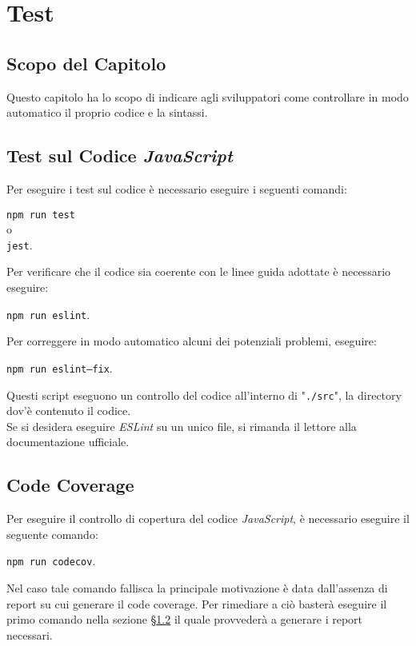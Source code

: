 \section{Test}\label{Test}

\subsection{Scopo del Capitolo}\label{Test_scopo}
Questo capitolo ha lo scopo di indicare agli sviluppatori come controllare in modo automatico il proprio codice e la sintassi.

\subsection{Test sul Codice \textit{JavaScript}}\label{test_JS}
Per eseguire i test sul codice è necessario eseguire i seguenti comandi:
\begin{center}
	\texttt{npm run test}\\
	o\\
	\texttt{jest}.
\end{center}
Per verificare che il codice sia coerente con le linee guida adottate è necessario eseguire:
\begin{center}
	\texttt{npm run eslint}.
\end{center}
Per correggere in modo automatico alcuni dei potenziali problemi, eseguire:
\begin{center}
	\texttt{npm run eslint--fix}.
\end{center}
Questi script eseguono un controllo del codice all'interno di "\texttt{./src}", la directory dov'è contenuto il codice.\\
Se si desidera eseguire \textit{ESLint} su un unico file, si rimanda il lettore alla documentazione ufficiale.

\subsection{Code Coverage}\label{test_codecoverage}
Per eseguire il controllo di copertura del codice \textit{JavaScript}, è necessario eseguire il seguente comando:
\begin{center}
	\texttt{npm run codecov}.
\end{center}
Nel caso tale comando fallisca la principale motivazione è data dall'assenza di report su cui generare il code coverage. Per rimediare a ciò basterà eseguire il primo comando nella sezione §\ref{test_JS} il quale provvederà a generare i report necessari.
